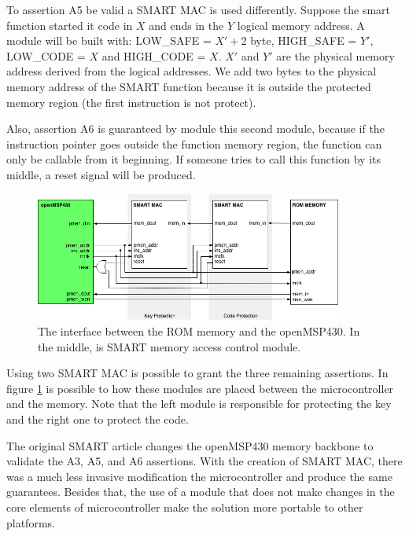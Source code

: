 To assertion A5 be valid a SMART MAC is used differently. Suppose the smart function started it code in $X$ and ends in the $Y$ logical memory address. A module will be built with: LOW\_SAFE = $X'+2$ byte,  HIGH\_SAFE = $Y'$, LOW\_CODE = $X$  and HIGH\_CODE = $X$.  $X'$ and $Y'$ are the physical memory address derived from the logical addresses. We add two bytes to the physical memory address of the SMART function because it is outside the protected memory region (the first instruction is not protect).

Also, assertion A6 is guaranteed by module this second module, because if the instruction pointer goes outside the function memory region, the function can only be callable from it beginning. If someone tries to call this function by its middle, a reset signal will be produced.




\begin{figure}[h]
	\centering
	\includegraphics[width=0.9\textwidth]{figuras/smart_mac}
	\caption{The interface between the ROM memory and the openMSP430. In the middle, is SMART memory access control module. }
	\label{fig:smart_mac}
\end{figure}

Using two SMART MAC is possible to grant the three remaining assertions. In figure \ref{fig:smart_mac} is possible to how these modules are placed between the microcontroller and the memory. Note that the left module is responsible for protecting the key and the right one to protect the code.

The original SMART article changes the openMSP430 memory backbone to validate the A3, A5, and A6 assertions.  With the creation of SMART MAC, there was a much less invasive modification the microcontroller and produce the same guarantees. Besides that, the use of a module that does not make changes in the core elements of microcontroller make the solution more portable to other platforms. 

